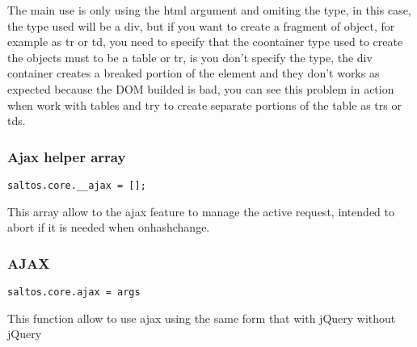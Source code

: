 \documentclass[a4paper]{article}
\begin{document}
The main use is only using the html argument and omiting the type, in this case, the
type used will be a div, but if you want to create a fragment of object, for example
as tr or td, you need to specify that the coontainer type used to create the objects
must to be a table or tr, is you don't specify the type, the div container creates
a breaked portion of the element and they don't works as expected because the DOM
builded is bad, you can see this problem in action when work with tables and try to
create separate portions of the table as trs or tds.

\hypertarget{toc702}{}
\subsubsection{Ajax helper array}

\begin{lstlisting}
saltos.core.__ajax = [];
\end{lstlisting}

This array allow to the ajax feature to manage the active request, intended to abort
if it is needed when onhashchange.

\hypertarget{toc703}{}
\subsubsection{AJAX}

\begin{lstlisting}
saltos.core.ajax = args
\end{lstlisting}

This function allow to use ajax using the same form that with jQuery without jQuery
\end{document}
